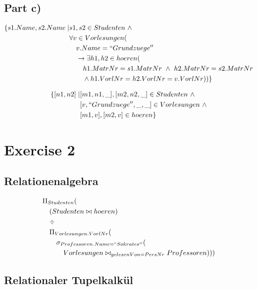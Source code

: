 \documentclass[10pt,a4paper]{article}
\begin{document}
\subsection*{Part c)}

\begin{align*}
  \{ s1.Name, s2.Name \mid & s1, s2 \in Studenten\ \land\\
                           & \forall v \in Vorlesungen (\\
                           & \quad v.Name = ``Grundzuege''\\
                           & \quad \rightarrow \exists h1, h2 \in hoeren (\\
                           & \quad \quad h1.MatrNr = s1.MatrNr\ \land\ h2.MatrNr = s2.MatrNr\\
                           & \quad \quad \land h1.VorlNr = h2.VorlNr = v.VorlNr)) \}
\end{align*}

\begin{align*}
  \{ [n1, n2] \mid & [m1, n1, \_], [m2, n2, \_] \in Studenten\ \land\\
                   & [v, ``Grundzuege'', \_, \_] \in Vorlesungen\ \land\\
                   & [m1, v], [m2, v] \in hoeren \}
\end{align*}

\section*{Exercise 2}

\subsection*{Relationenalgebra}

\begin{align*}
  & \Pi_{Studenten}(\\
  & \quad (Studenten \bowtie hoeren)\\
  & \quad \div\\
  & \quad \Pi_{Vorlesungen.VorlNr}(\\
  & \quad \quad \sigma_{Professoren.Name = ``Sokrates''}(\\
  & \quad \quad \quad Vorlesungen \bowtie_{gelesenVon = PersNr} Professoren)))
\end{align*}

\subsection*{Relationaler Tupelkalkül}
\end{document}
